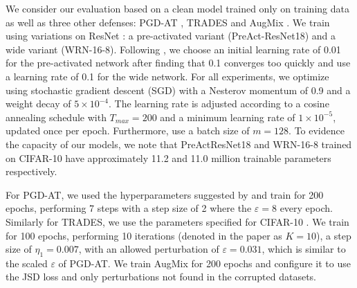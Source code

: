 \documentclass[a4paper]{article}
\begin{document}
We consider our evaluation based on a clean model trained only on training data
as well as three other defenses:
PGD-AT \cite{madry2018deeplearningmodelsresistant},
TRADES \cite{zhang2019trades}
and AugMix \cite{hendrycks2020augmix}. We train using
variations on ResNet \cite{he2016deepresidual}:
a pre-activated variant \cite{he2016identity} (PreAct-ResNet18)
and a wide variant \cite{zagoruyko2016wideresidualnetworks} (WRN-16-8).
Following \citeauthor{he2016identity}, we choose an initial learning
rate of 0.01 for the pre-activated network after finding that 0.1 converges too
quickly and use a learning rate of 0.1 for the wide network. For all
experiments, we optimize using stochastic gradient descent (SGD) with
a Nesterov momentum of 0.9 and a weight decay of $5\times 10^{-4}$. The learning
rate is adjusted according to a cosine annealing schedule
\cite{loshchilov2017sgdr} with $T_{max} = 200$ and a minimum learning rate of
$1 \times 10^{-5}$, updated once per epoch. Furthermore, use a batch size of
$m = 128$. To evidence the capacity of our models, we note that PreActResNet18
and WRN-16-8 trained on CIFAR-10 have approximately 11.2 and 11.0 million
trainable parameters respectively.

For PGD-AT, we used the hyperparameters suggested by
\textcite{madry2018deeplearningmodelsresistant} and train for 200 epochs,
performing 7 steps with a step size of 2 where the $\varepsilon = 8$ every epoch.
Similarly for TRADES, we use the parameters specified for CIFAR-10
\cite{zhang2019trades}.
We train for 100 epochs, performing 10 iterations (denoted
in the paper as $K = 10$), a step size of $\eta_1 = 0.007$, with an allowed
perturbation of $\varepsilon = 0.031$, which is similar to the scaled
$\varepsilon$ of PGD-AT. We train AugMix for 200 epochs and configure it to use
the JSD loss and only perturbations not found in the corrupted datasets.
\end{document}
